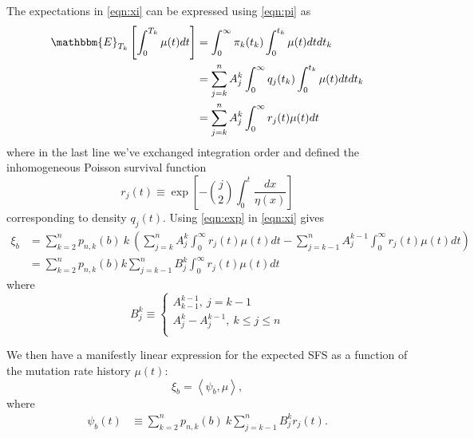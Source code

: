 \documentclass[11pt]{article}
\begin{document}
The expectations in \eqref{eqn:xi} can be expressed using \eqref{eqn:pi} as
\begin{align}
\label{eqn:exp}
\mathbbm{E}_{T_k}\left[\int_0^{T_k}\mu(t)dt\right] &= \int_0^\infty\pi_k(t_k)\int_0^{t_k}\mu(t)dt dt_k\nonumber\\
&= \sum_{j=k}^n A_j^k\int_0^\infty q_j(t_k)\int_0^{t_k}\mu(t)dt dt_k\nonumber\\
&= \sum_{j=k}^n A_j^k\int_0^\infty r_j(t)\mu(t)dt
\end{align}
where in the last line we've exchanged integration order and defined the inhomogeneous Poisson survival function
\begin{equation}
\label{eqn:r}
r_j(t) \equiv \exp\left[-\binom{j}{2}\int_0^t\frac{dx}{\eta(x)}\right]
\end{equation}
corresponding to density $q_j(t)$.
Using \eqref{eqn:exp} in \eqref{eqn:xi} gives
\begin{align}
\label{eqn:xi2}
\xi_b &= \sum_{k=2}^n p_{n,k}(b)\ k\ \left(\sum_{j=k}^n A_j^k\int_0^\infty r_j(t)\mu(t)dt - \sum_{j=k-1}^n A_j^{k-1}\int_0^\infty r_j(t)\mu(t)dt\right)\nonumber\\
&= \sum_{k=2}^n p_{n,k}(b) k \sum_{j=k-1}^n B_j^k\int_0^\infty r_j(t)\mu(t)dt
\end{align}
where
\[
B_j^k \equiv
\begin{cases}
A_{k-1}^{k-1},\ j=k-1\\
A_j^k - A_j^{k-1},\ k\le j\le n\\
\end{cases}
\]

We then have a manifestly linear expression for the expected SFS as a function of the mutation rate history $\mu(t)$:
\[
\xi_b = \left<\psi_b, \mu\right>,
\]
where
\begin{align*}
\psi_b(t) &\equiv \sum_{k=2}^n p_{n,k}(b)\ k \sum_{j=k-1}^{n}B_j^k r_j(t).
\end{align*}
\end{document}
